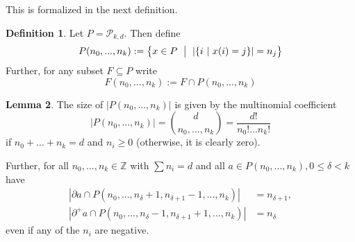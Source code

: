 \documentclass{scrartcl}
\newcommand{\Z}{\mathbb{Z}}
\theoremstyle{definition}
\newtheorem{definition}{Definition}
\newtheorem{lemma}[definition]{Lemma}
\begin{document}
This is formalized in the next definition.
\begin{definition}
    Let $P = \mathcal{P}_{k, d}$. Then define
    \begin{equation*}
        P(n_0, ..., n_k) := \bigl\{ x \in P \ \bigm| \ |\{i \ | \ x(i) = j\}| = n_j \bigl\}
    \end{equation*}
    Further, for any subset $F \subseteq P$ write
    \begin{equation*}
        F(n_0, ..., n_k) := F \cap P(n_0, ..., n_k)
    \end{equation*}
\end{definition}
\begin{lemma}
    \label{prop:properties_n_distribution_subsets}
    The size of $|P(n_0, ..., n_k)|$ is given by the multinomial coefficient
    \begin{equation*}
        |P(n_0, ..., n_k)| = { d \choose n_0, ..., n_k } =  \frac {d!} {n_0! ... n_k!}
    \end{equation*}
    if $n_0 + ... + n_k = d$ and $n_i \geq 0$ (otherwise, it is clearly zero).

    Further, for all $n_0, ..., n_k \in \Z$ with $\sum n_i = d$ and all $a \in P(n_0, ..., n_k), 0 \leq \delta < k$ have
    \begin{align*}
        |\partial a \cap P(n_0, ..., n_\delta + 1, n_{\delta + 1} - 1, ..., n_k)| &= n_{\delta + 1}, \\
        |\partial^+ a \cap P(n_0, ..., n_\delta - 1, n_{\delta + 1} + 1, ..., n_k)| &= n_\delta
    \end{align*}
    even if any of the $n_i$ are negative.
\end{lemma}
\end{document}
